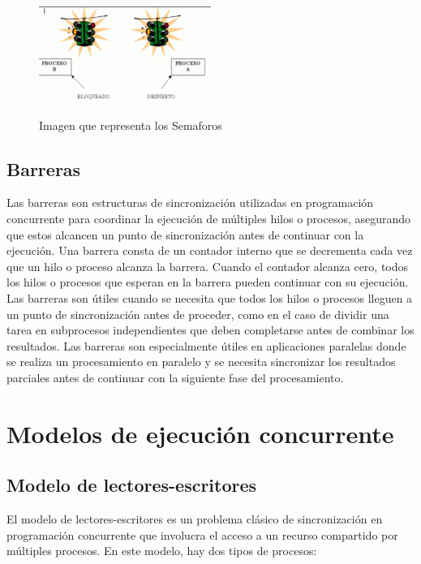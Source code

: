\documentclass[12pt,a4paper]{article}
\begin{document}
\begin{figure}[htb!]
    \centering
    \caption{Imagen que representa los Semaforos } 
    \includegraphics[width=0.5\textwidth]{images/semaforo.png}
    
\end{figure}
\subsection{Barreras}
Las barreras son estructuras de sincronización utilizadas en programación concurrente para coordinar la ejecución de múltiples hilos o procesos, asegurando que estos alcancen un punto de sincronización antes de continuar con la ejecución.
\espacio
Una barrera consta de un contador interno que se decrementa cada vez que un hilo o proceso alcanza la barrera. Cuando el contador alcanza cero, todos los hilos o procesos que esperan en la barrera pueden continuar con su ejecución.
\espacio
Las barreras son útiles cuando se necesita que todos los hilos o procesos lleguen a un punto de sincronización antes de proceder, como en el caso de dividir una tarea en subprocesos independientes que deben completarse antes de combinar los resultados.
\espacio
Las barreras son especialmente útiles en aplicaciones paralelas donde se realiza un procesamiento en paralelo y se necesita sincronizar los resultados parciales antes de continuar con la siguiente fase del procesamiento.
\section{Modelos de ejecución concurrente}
\subsection{Modelo de lectores-escritores}
El modelo de lectores-escritores es un problema clásico de sincronización en programación concurrente que involucra el acceso a un recurso compartido por múltiples procesos. En este modelo, hay dos tipos de procesos:
\end{document}
